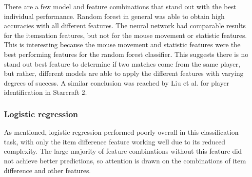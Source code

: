\documentclass[Report.tex]{subfiles}
\begin{document}

There are a few model and feature combinations that stand out with the best individual performance. Random forest in general was able to obtain high accuracies with all different features. The neural network had comparable results for the itemsation features, but not for the mouse movement or statistic features. This is interesting because the mouse movement and statistic features were the best performing features for the random forest classifier. This suggests there is no stand out best feature to determine if two matches come from the same player, but rather, different models are able to apply the different features with varying degrees of success. A similar conclusion was reached by Liu et al. \cite{starcraft-identification} for player identification in Starcraft 2. 

\subsubsection{Logistic regression}
As mentioned, logistic regression performed poorly overall in this classification task, with only the item difference feature working well due to its reduced complexity. The large majority of feature combinations without this feature did not achieve better predictions, so attention is drawn on the combinations of item difference and other features. 
\end{document}
